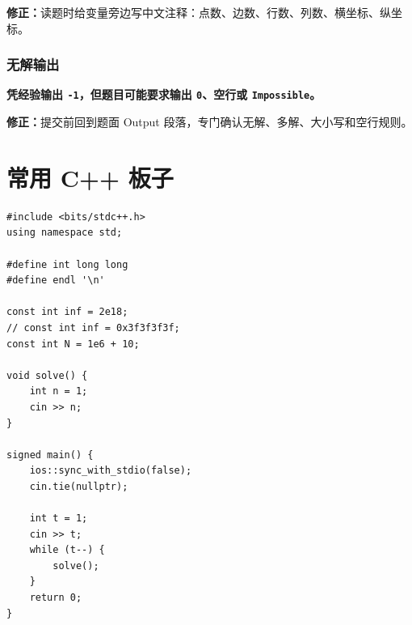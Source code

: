 \documentclass[UTF8,openany,oneside,zihao=-4]{ctexbook}
\newcommand{\risk}[1]{%
  \vspace{0.35em}
  \noindent\colorbox{softred}{%
    \parbox{\dimexpr\linewidth-2\fboxsep}{\textcolor{danger}{\textbf{#1}}}}%
  \vspace{0.35em}
}
\newcommand{\fix}[1]{%
  \vspace{0.35em}
  \noindent\colorbox{softgreen}{%
    \parbox{\dimexpr\linewidth-2\fboxsep}{\textbf{修正：}#1}}%
  \vspace{0.35em}
}
\begin{document}
\fix{读题时给变量旁边写中文注释：点数、边数、行数、列数、横坐标、纵坐标。}

\subsection{无解输出}

\risk{凭经验输出 \texttt{-1}，但题目可能要求输出 \texttt{0}、空行或 \texttt{Impossible}。}

\fix{提交前回到题面 Output 段落，专门确认无解、多解、大小写和空行规则。}

\appendix
\chapter{常用 C++ 板子}

\begin{lstlisting}
#include <bits/stdc++.h>
using namespace std;

#define int long long
#define endl '\n'

const int inf = 2e18;
// const int inf = 0x3f3f3f3f;
const int N = 1e6 + 10;

void solve() {
    int n = 1;
    cin >> n;
}

signed main() {
    ios::sync_with_stdio(false);
    cin.tie(nullptr);

    int t = 1;
    cin >> t;
    while (t--) {
        solve();
    }
    return 0;
}
\end{lstlisting}
\end{document}
